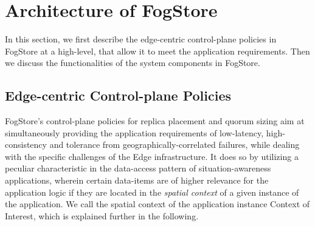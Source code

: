 \section{Architecture of FogStore}
\label{sec:fogstore_arch}
In this section, we first describe the edge-centric control-plane policies in FogStore at a high-level, that allow it to meet the application requirements. Then we discuss the functionalities of the system components in FogStore.

\subsection{Edge-centric Control-plane Policies}
FogStore's control-plane policies for replica placement and quorum sizing aim at simultaneously providing the application requirements of low-latency, high-consistency and tolerance from geographically-correlated failures, while dealing with the specific challenges of the Edge infrastructure. It does so by utilizing a peculiar characteristic in the data-access pattern of situation-awareness applications, wherein certain data-items are of higher relevance for the application logic if they are located in the \textit{spatial context} of a given instance of the application. We call the spatial context of the application instance Context of Interest, which is explained further in the following.
